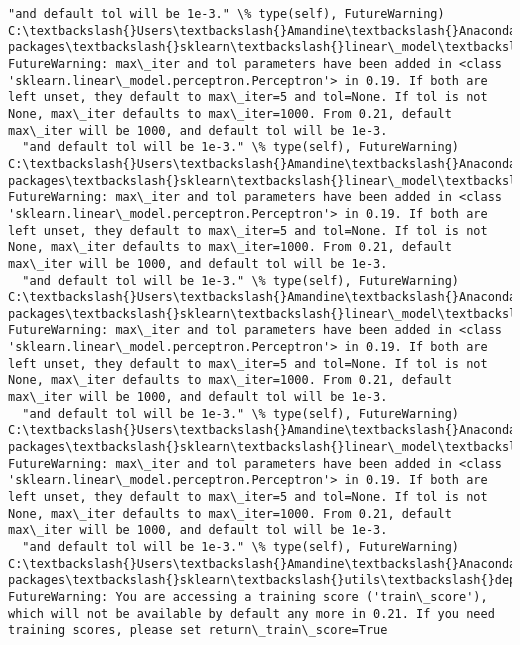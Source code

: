 \documentclass[11pt]{article}
\begin{document}
\begin{Verbatim}[commandchars=\\\{\}]
  "and default tol will be 1e-3." \% type(self), FutureWarning)
C:\textbackslash{}Users\textbackslash{}Amandine\textbackslash{}Anaconda3\textbackslash{}lib\textbackslash{}site-packages\textbackslash{}sklearn\textbackslash{}linear\_model\textbackslash{}stochastic\_gradient.py:128: FutureWarning: max\_iter and tol parameters have been added in <class 'sklearn.linear\_model.perceptron.Perceptron'> in 0.19. If both are left unset, they default to max\_iter=5 and tol=None. If tol is not None, max\_iter defaults to max\_iter=1000. From 0.21, default max\_iter will be 1000, and default tol will be 1e-3.
  "and default tol will be 1e-3." \% type(self), FutureWarning)
C:\textbackslash{}Users\textbackslash{}Amandine\textbackslash{}Anaconda3\textbackslash{}lib\textbackslash{}site-packages\textbackslash{}sklearn\textbackslash{}linear\_model\textbackslash{}stochastic\_gradient.py:128: FutureWarning: max\_iter and tol parameters have been added in <class 'sklearn.linear\_model.perceptron.Perceptron'> in 0.19. If both are left unset, they default to max\_iter=5 and tol=None. If tol is not None, max\_iter defaults to max\_iter=1000. From 0.21, default max\_iter will be 1000, and default tol will be 1e-3.
  "and default tol will be 1e-3." \% type(self), FutureWarning)
C:\textbackslash{}Users\textbackslash{}Amandine\textbackslash{}Anaconda3\textbackslash{}lib\textbackslash{}site-packages\textbackslash{}sklearn\textbackslash{}linear\_model\textbackslash{}stochastic\_gradient.py:128: FutureWarning: max\_iter and tol parameters have been added in <class 'sklearn.linear\_model.perceptron.Perceptron'> in 0.19. If both are left unset, they default to max\_iter=5 and tol=None. If tol is not None, max\_iter defaults to max\_iter=1000. From 0.21, default max\_iter will be 1000, and default tol will be 1e-3.
  "and default tol will be 1e-3." \% type(self), FutureWarning)
C:\textbackslash{}Users\textbackslash{}Amandine\textbackslash{}Anaconda3\textbackslash{}lib\textbackslash{}site-packages\textbackslash{}sklearn\textbackslash{}linear\_model\textbackslash{}stochastic\_gradient.py:128: FutureWarning: max\_iter and tol parameters have been added in <class 'sklearn.linear\_model.perceptron.Perceptron'> in 0.19. If both are left unset, they default to max\_iter=5 and tol=None. If tol is not None, max\_iter defaults to max\_iter=1000. From 0.21, default max\_iter will be 1000, and default tol will be 1e-3.
  "and default tol will be 1e-3." \% type(self), FutureWarning)
C:\textbackslash{}Users\textbackslash{}Amandine\textbackslash{}Anaconda3\textbackslash{}lib\textbackslash{}site-packages\textbackslash{}sklearn\textbackslash{}utils\textbackslash{}deprecation.py:122: FutureWarning: You are accessing a training score ('train\_score'), which will not be available by default any more in 0.21. If you need training scores, please set return\_train\_score=True

\end{Verbatim}
\end{document}
